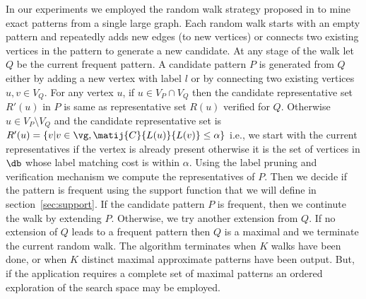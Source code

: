 In our experiments we employed the random walk strategy proposed in
\cite{2011-icdm} to mine exact patterns from a single large graph. Each random
walk starts with an empty pattern and repeatedly adds new edges (to new
vertices) or connects two existing vertices in the pattern to generate a new
candidate. At any stage of the walk let $Q$ be the current frequent pattern.  A
candidate pattern $P$ is generated from $Q$ either by adding a new vertex with
label $l$ or by connecting two existing vertices $u, v \in V_Q$.  For any vertex
$u$, if $u \in V_P \cap V_Q$ then the candidate representative set $R'(u)$ in
$P$ is same as representative set $R(u)$ verified for $Q$. Otherwise $u \in V_P
\setminus V_Q$ and the candidate representative set is $R'(u) = \{ v | v \in
\vg, \matij{C}{L(u)}{L(v)} \leq \alpha \} $ i.e., we start with the current
representatives if the vertex is already present otherwise it is the set of
vertices in $\db$ whose label matching cost is within $\alpha$. Using the label
pruning and verification mechanism we compute the representatives of $P$.  Then
we decide if the pattern is frequent using the support function that we will
define in section~\ref{sec:support}. If the candidate pattern $P$ is frequent,
then we continute the walk by extending $P$. Otherwise, we  try another
extension from $Q$. If no extension of $Q$ leads to a frequent pattern then $Q$
is a maximal and we terminate the current random walk.  The algorithm terminates
when $K$ walks have been done, or when $K$ distinct maximal approximate patterns
have been output. But, if the application requires a complete set of maximal
patterns an ordered exploration of the search space may be employed.

